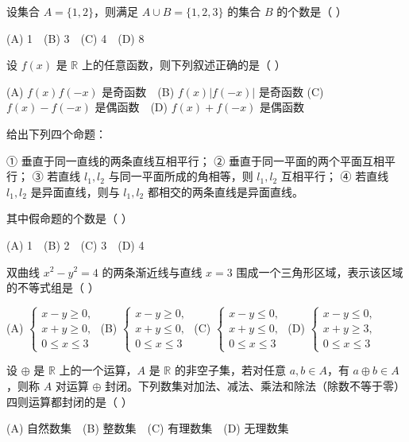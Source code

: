 \begin{question}
设集合 $A=\{1,2\}$，则满足 $A\cup B=\{1,2,3\}$ 的集合 $B$ 的个数是（ ）

(A) 1　(B) 3　(C) 4　(D) 8

\end{question}
\begin{question}
设 $f(x)$ 是 $\mathbb R$ 上的任意函数，则下列叙述正确的是（ ）

(A) $f(x)f(-x)$ 是奇函数　(B) $f(x)|f(-x)|$ 是奇函数
(C) $f(x)-f(-x)$ 是偶函数　(D) $f(x)+f(-x)$ 是偶函数

\end{question}
\begin{question}
给出下列四个命题：

① 垂直于同一直线的两条直线互相平行；
② 垂直于同一平面的两个平面互相平行；
③ 若直线 $l_1,l_2$ 与同一平面所成的角相等，则 $l_1,l_2$ 互相平行；
④ 若直线 $l_1,l_2$ 是异面直线，则与 $l_1,l_2$ 都相交的两条直线是异面直线。

其中假命题的个数是（ ）

(A) 1　(B) 2　(C) 3　(D) 4

\end{question}
\begin{question}
双曲线 $x^2-y^2=4$ 的两条渐近线与直线 $x=3$ 围成一个三角形区域，表示该区域的不等式组是（ ）

(A) $\left\{\begin{array}{l}x-y\geq0,\\x+y\geq0,\\0\leq x\leq3\end{array}\right.$
(B) $\left\{\begin{array}{l}x-y\geq0,\\x+y\leq0,\\0\leq x\leq3\end{array}\right.$
(C) $\left\{\begin{array}{l}x-y\leq0,\\x+y\leq0,\\0\leq x\leq3\end{array}\right.$
(D) $\left\{\begin{array}{l}x-y\leq0,\\x+y\geq3,\\0\leq x\leq3\end{array}\right.$

\end{question}
\begin{question}
设 $\oplus$ 是 $\mathbb R$ 上的一个运算，$A$ 是 $\mathbb R$ 的非空子集，若对任意 $a,b\in A$，有 $a\oplus b\in A$，则称 $A$ 对运算 $\oplus$ 封闭。下列数集对加法、减法、乘法和除法（除数不等于零）四则运算都封闭的是（ ）

(A) 自然数集　(B) 整数集　(C) 有理数集　(D) 无理数集

\end{question}
